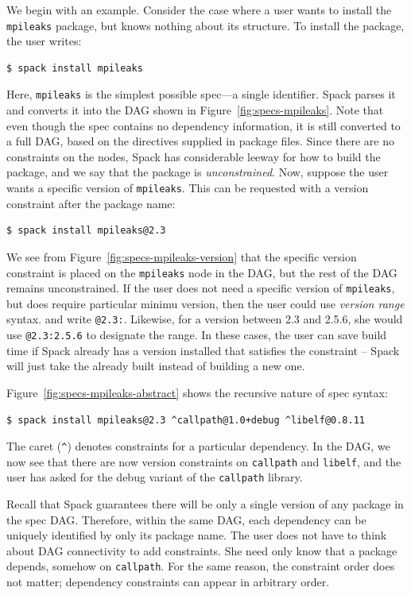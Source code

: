We begin with an example.%
Consider the case where a user wants to install the {\tt mpileaks} package, but knows
nothing about its structure.  To install the package, the user writes:
%
\begin{verbatim}
$ spack install mpileaks
\end{verbatim}
%
Here, {\tt mpileaks} is the simplest possible spec---a single identifier.
Spack parses it and converts it into the DAG shown in Figure~\ref{fig:specs-mpileaks}.
Note that even though the spec contains no dependency information, it is still 
converted to a full DAG, based on the directives supplied in package files. Since there
are no constraints on the nodes, Spack has considerable leeway for how to build the package,
and we say that the package is {\it unconstrained}.
%
Now, suppose the user wants a specific version of {\tt mpileaks}.  This can be requested
with a version constraint after the package name:
%
\begin{verbatim}
$ spack install mpileaks@2.3
\end{verbatim}
%
We see from Figure~\ref{fig:specs-mpileaks-version} that the specific version constraint is
placed on the {\tt mpileaks} node in the DAG, but the rest of the DAG remains unconstrained.
If the user does not need a specific version of {\tt mpileaks}, but does require
particular minimu version, then the user could use {\it version range} syntax.
and write {\tt @2.3:}.  Likewise, for a version between 2.3 and 2.5.6, she would use
{\tt @2.3:2.5.6} to designate the range. In these cases, the user can save build time if
Spack already has a version installed that satisfies the constraint -- Spack will just take
the already built instead of building a new one.

Figure~\ref{fig:specs-mpileaks-abstract} shows the recursive nature of spec syntax:
%
\begin{verbatim}
$ spack install mpileaks@2.3 ^callpath@1.0+debug ^libelf@0.8.11
\end{verbatim}
%
The caret (\verb|^|) denotes constraints for a particular dependency.  In the DAG,
we now see that there are now version constraints on {\tt callpath} and {\tt libelf},
and the user has asked for the debug variant of the {\tt callpath} library.

Recall that Spack guarantees there will be only a single version of any package in 
the spec DAG.  Therefore, within the same DAG, each dependency can be uniquely identified by 
only its package name.  The user does not have to think about DAG connectivity to add
constraints.  She need only know that a package depends, somehow on {\tt callpath}. 
For the same reason, the constraint order does not matter; dependency constraints
can appear in arbitrary order.

